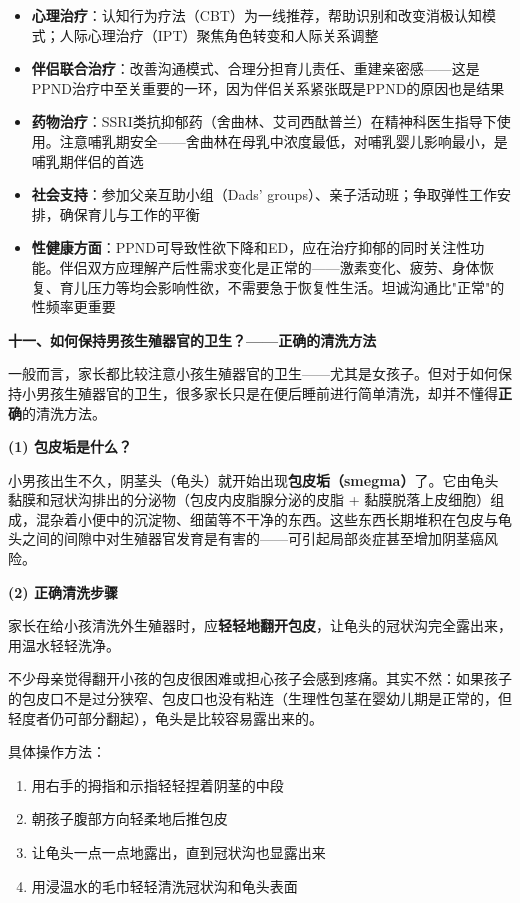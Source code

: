 \begin{itemize}[leftmargin=2cm]
	\item \textbf{心理治疗}：认知行为疗法（CBT）为一线推荐，帮助识别和改变消极认知模式；人际心理治疗（IPT）聚焦角色转变和人际关系调整
	\item \textbf{伴侣联合治疗}：改善沟通模式、合理分担育儿责任、重建亲密感——这是PPND治疗中至关重要的一环，因为伴侣关系紧张既是PPND的原因也是结果
	\item \textbf{药物治疗}：SSRI类抗抑郁药（舍曲林、艾司西酞普兰）在精神科医生指导下使用。注意哺乳期安全——舍曲林在母乳中浓度最低，对哺乳婴儿影响最小，是哺乳期伴侣的首选
	\item \textbf{社会支持}：参加父亲互助小组（Dads' groups）、亲子活动班；争取弹性工作安排，确保育儿与工作的平衡
	\item \textbf{性健康方面}：PPND可导致性欲下降和ED，应在治疗抑郁的同时关注性功能。伴侣双方应理解产后性需求变化是正常的——激素变化、疲劳、身体恢复、育儿压力等均会影响性欲，不需要急于恢复性生活。坦诚沟通比"正常"的性频率更重要
\end{itemize}

\vspace{0.8em}
\noindent\textbf{十一、如何保持男孩生殖器官的卫生？——正确的清洗方法}

一般而言，家长都比较注意小孩生殖器官的卫生——尤其是女孩子。但对于如何保持小男孩生殖器官的卫生，很多家长只是在便后睡前进行简单清洗，却并不懂得\textbf{正确}的清洗方法。

\vspace{0.5em}
\noindent\textbf{(1) 包皮垢是什么？}

小男孩出生不久，阴茎头（龟头）就开始出现\textbf{包皮垢（smegma）}了。它由龟头黏膜和冠状沟排出的分泌物（包皮内皮脂腺分泌的皮脂 + 黏膜脱落上皮细胞）组成，混杂着小便中的沉淀物、细菌等不干净的东西。这些东西长期堆积在包皮与龟头之间的间隙中对生殖器官发育是有害的——可引起局部炎症甚至增加阴茎癌风险。

\vspace{0.3em}
\noindent\textbf{(2) 正确清洗步骤}

家长在给小孩清洗外生殖器时，应\textbf{轻轻地翻开包皮}，让龟头的冠状沟完全露出来，用温水轻轻洗净。

不少母亲觉得翻开小孩的包皮很困难或担心孩子会感到疼痛。其实不然：如果孩子的包皮口不是过分狭窄、包皮口也没有粘连（生理性包茎在婴幼儿期是正常的，但轻度者仍可部分翻起），龟头是比较容易露出来的。

具体操作方法：
\begin{enumerate}
	\item 用右手的拇指和示指轻轻捏着阴茎的中段
	\item 朝孩子腹部方向轻柔地后推包皮
	\item 让龟头一点一点地露出，直到冠状沟也显露出来
	\item 用浸温水的毛巾轻轻清洗冠状沟和龟头表面
\end{enumerate}

